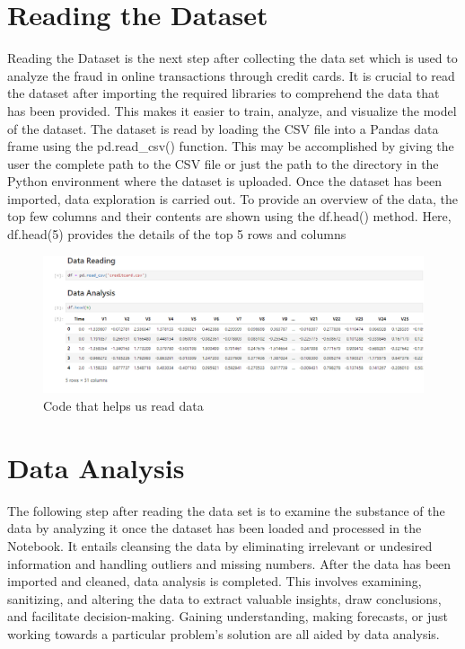 \section{Reading the Dataset}
Reading the Dataset is the next step after collecting the data set which is used to analyze the fraud in online transactions through credit cards. It is crucial to read the dataset after importing the required libraries to comprehend the data that has been provided. This makes it easier to train, analyze, and visualize the model of the dataset. The dataset is read by loading the CSV file into a Pandas data frame using the pd.read\_csv() function. This may be accomplished by giving the user the complete path to the CSV file or just the path to the directory in the Python environment where the dataset is uploaded. Once the dataset has been imported, data exploration is carried out. To provide an overview of the data, the top few columns and their contents are shown using the df.head() method. Here, df.head(5) provides the details of the top 5 rows and columns 


\begin{figure}[ht]
    \centering
    \includegraphics[scale=1]{figures/Data Reading.png}
    \caption{Code that helps us read data}
    \label{fig:Data Preprocessing}
\end{figure}


\section{Data Analysis}
The following step after reading the data set is to examine the substance of the data by analyzing it once the dataset has been loaded and processed in the Notebook. It entails cleansing the data by eliminating irrelevant or undesired information and handling outliers and missing numbers. After the data has been imported and cleaned, data analysis is completed. This involves examining, sanitizing, and altering the data to extract valuable insights, draw conclusions, and facilitate decision-making. Gaining understanding, making forecasts, or just working towards a particular problem's solution are all aided by data analysis. 

